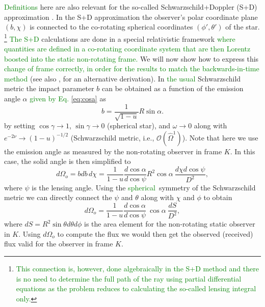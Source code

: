 \documentclass{aa}
\newcommand{\be}{\begin{equation}}
\newcommand{\ee}{\end{equation}}
\newcommand{\refe}[1]{\textcolor{green}{{#1}}}
\newcommand{\sch}{Schwarzschild }
\newcommand{\Ob}{\ensuremath{\hat{\Omega}}}
\begin{document}
\refe{Definitions} here are also relevant for the so-called Schwarzschild+Doppler (S+D) approximation \cite[see e.g.,][]{PB06}.
In the S+D approximation the observer's polar coordinate plane $(b,\chi)$ is connected to the co-rotating spherical coordinates $(\phi', \theta')$ of the star.%
\footnote{\refe{This connection is, however, done algebraically in the S+D method and there is no need to determine the full path of the ray using partial differential equations as the problem reduces to calculating the so-called lensing integral only.}
}
\refe{The S+D} calculations are done in a special relativistic framework \refe{where quantities are defined in a co-rotating coordinate system that are then Lorentz boosted into the static non-rotating frame.}
We will now show how to express this \refe{change of frame correctly, in order for the results to match the backwards-in-time method} (see also \citealt{CML07}, for an alternative derivation).
In \refe{the usual} \sch metric the impact parameter $b$ can be obtained as a function of the emission angle $\alpha$ \refe{given by Eq.} \eqref{eq:cosa} as
\be
b = \frac{1}{\sqrt{1-u}} R \sin\alpha.
\ee
by setting $\cos\gamma \rightarrow 1$, $\sin\gamma \rightarrow 0$ (spherical star), and $\omega \rightarrow 0$ along with $e^{-2\nu} \rightarrow (1-u)^{-1/2}$ (\sch metric, i.e., $\mathcal{O}(\Ob^1)$).
Note that here we use the emission angle as measured by the non-rotating observer in frame $K$.
In this case, the solid angle is then simplified to 
\be
d\Omega_o = bdb \, d\chi = \frac{1}{1-u} \frac{d \cos\alpha}{d \cos\psi} R^2 \cos\alpha ~ \frac{d\chi d\cos\psi}{D^2},
\ee
where $\psi$ is the lensing angle.
Using the \refe{spherical} symmetry of the \sch metric we can directly connect the $\psi$ and $\theta$ along with $\chi$ and $\phi$ to obtain
\be
d\Omega_o = \frac{1}{1-u} \frac{d \cos\alpha}{d \cos\psi} ~\cos\alpha ~ \frac{dS}{D^2},
\ee
where $dS = R^2 \sin\theta d\theta d\phi$ is the area element for the non-rotating static observer in $K$.
Using $d\Omega_o$ to compute the flux we would then get the observed (received) flux valid for the observer in frame $K$.
\end{document}
